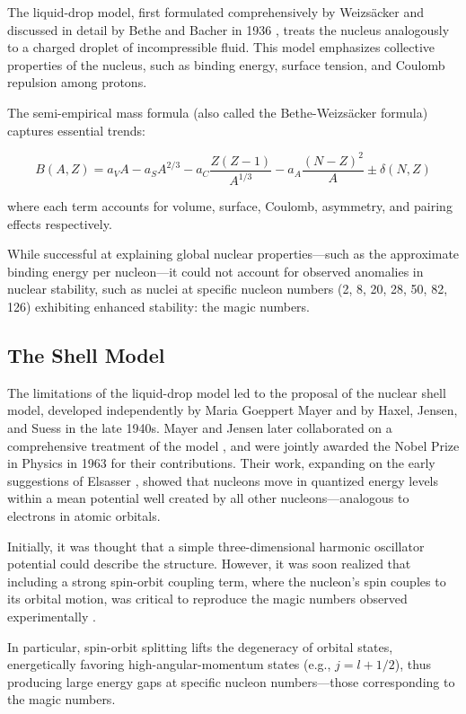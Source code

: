 The liquid-drop model, first formulated comprehensively by Weizsäcker \cite{Weizsacker_1935} and discussed in detail by Bethe and Bacher in 1936 \cite{bethe_nuclear_1936}, treats the nucleus analogously to a charged droplet of incompressible fluid. This model emphasizes collective properties of the nucleus, such as binding energy, surface tension, and Coulomb repulsion among protons.

The semi-empirical mass formula (also called the Bethe-Weizsäcker formula) captures essential trends:

\[B(A,Z) = a_VA - a_SA^{2/3} - a_C\frac{Z(Z-1)}{A^{1/3}} - a_A\frac{(N-Z)^2}{A}\pm \delta(N,Z)\]

where each term accounts for volume, surface, Coulomb, asymmetry, and pairing effects respectively.

While successful at explaining global nuclear properties—such as the approximate binding energy per nucleon—it could not account for observed anomalies in nuclear stability, such as nuclei at specific nucleon numbers (2, 8, 20, 28, 50, 82, 126) exhibiting enhanced stability: the magic numbers.

\subsection{The Shell Model}

The limitations of the liquid-drop model led to the proposal of the nuclear shell model, developed independently by Maria Goeppert Mayer \cite{mayer_1948} and by Haxel, Jensen, and Suess \cite{haxel_magic_nodate} in the late 1940s. Mayer and Jensen later collaborated on a comprehensive treatment of the model \cite{MayerandJensen_1955}, and were jointly awarded the Nobel Prize in Physics in 1963 for their contributions. Their work, expanding on the early suggestions of Elsasser \cite{elsasser_sur_1933}, showed that nucleons move in quantized energy levels within a mean potential well created by all other nucleons—analogous to electrons in atomic orbitals.

Initially, it was thought that a simple three-dimensional harmonic oscillator potential could describe the structure. However, it was soon realized that including a strong spin-orbit coupling term, where the nucleon's spin couples to its orbital motion, was critical to reproduce the magic numbers observed experimentally \cite{mayer_shell_1968}.

In particular, spin-orbit splitting lifts the degeneracy of orbital states, energetically favoring high-angular-momentum states (e.g., $j=l+1/2$), thus producing large energy gaps at specific nucleon numbers—those corresponding to the magic numbers.

